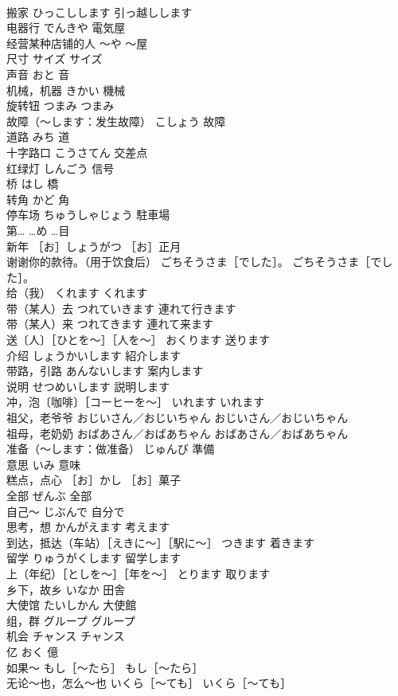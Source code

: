 \documentclass[8pt]{extreport}
\begin{document}
\begin{CJK}{UTF8}{min}
\\	搬家	ひっこしします	引っ越しします
\\	电器行	でんきや	電気屋
\\	经营某种店铺的人	～や	～屋
\\	尺寸	サイズ	サイズ
\\	声音	おと	音
\\	机械，机器	きかい	機械
\\	旋转钮	つまみ	つまみ
\\	故障（～します：发生故障）	こしょう	故障
\\	道路	みち	道
\\	十字路口	こうさてん	交差点
\\	红绿灯	しんごう	信号
\\	桥	はし	橋
\\	转角	かど	角
\\	停车场	ちゅうしゃじょう	駐車場
\\	第…	…め	…目
\\	新年	［お］しょうがつ	［お］正月
\\	谢谢你的款待。（用于饮食后）	ごちそうさま［でした］。	ごちそうさま［でした］。
\\	给（我）	くれます	くれます
\\	带（某人）去	つれていきます	連れて行きます
\\	带（某人）来	つれてきます	連れて来ます
\\	送〔人〕［ひとを～］［人を～］	おくります	送ります
\\	介绍	しょうかいします	紹介します
\\	带路，引路	あんないします	案内します
\\	说明	せつめいします	説明します
\\	冲，泡〔咖啡〕［コーヒーを～］	いれます	いれます
\\	祖父，老爷爷	おじいさん／おじいちゃん	おじいさん／おじいちゃん
\\	祖母，老奶奶	おばあさん／おばあちゃん	おばあさん／おばあちゃん
\\	准备（～します：做准备）	じゅんび	準備
\\	意思	いみ	意味
\\	糕点，点心	［お］かし	［お］菓子
\\	全部	ぜんぶ	全部
\\	自己～	じぶんで	自分で
\\	思考，想	かんがえます	考えます
\\	到达，抵达（车站）［えきに～］［駅に～］	つきます	着きます
\\	留学	りゅうがくします	留学します
\\	上（年纪）［としを～］［年を～］	とります	取ります
\\	乡下，故乡	いなか	田舎
\\	大使馆	たいしかん	大使館
\\	组，群	グループ	グループ
\\	机会	チャンス	チャンス
\\	亿	おく	億
\\	如果～	もし［～たら］	もし［～たら］
\\	无论～也，怎么～也	いくら［～ても］	いくら［～ても］
\end{CJK}
\end{document}
